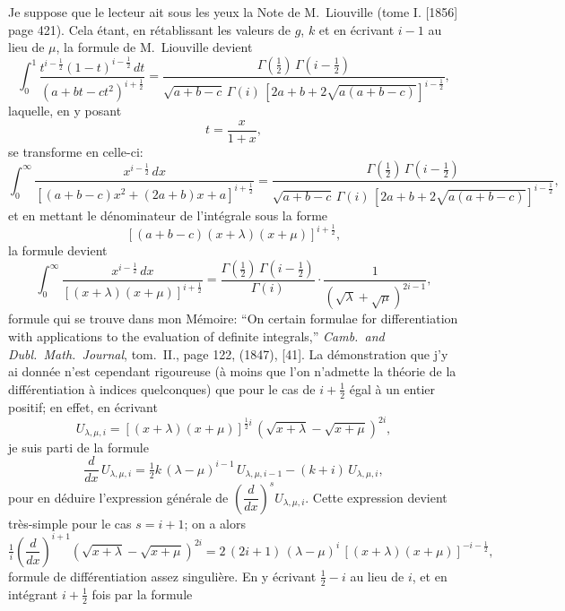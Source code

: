 \documentclass[11pt,a4paper]{book}
\theoremstyle{plain}
\begin{document}
Je suppose que le lecteur ait sous les yeux la Note de M.~Liouville (tome I. [1856] page 421). Cela \'{e}tant, en r\'{e}tablissant les valeurs de $g$, $k$ et en \'{e}crivant $i-1$ au lieu de $\mu$, la formule de M.~Liouville devient
\begin{equation}
\int_0^1\frac{t^{i-\frac{1}{2}}(1-t)^{i-\frac{1}{2}}\,dt}{(a+bt-ct^2)^{i+\frac{1}{2}}}
=\frac{\Gamma(\tfrac{1}{2})\,\Gamma(i-\tfrac{1}{2})}{\sqrt{a+b-c}\,\Gamma(i)\,[2a+b+2\sqrt{a(a+b-c)}]^{i-\frac{1}{2}}},
\end{equation}
laquelle, en y posant
\[
t=\frac{x}{1+x},
\]
se transforme en celle-ci:
\begin{equation}
\int_0^{\infty}\frac{x^{i-\frac{1}{2}}\,dx}{[(a+b-c)x^2+(2a+b)x+a]^{i+\frac{1}{2}}}
=\frac{\Gamma(\tfrac{1}{2})\,\Gamma(i-\tfrac{1}{2})}{\sqrt{a+b-c}\,\Gamma(i)\,[2a+b+2\sqrt{a(a+b-c)}]^{i-\frac{1}{2}}},
\end{equation}
et en mettant le d\'{e}nominateur de l'int\'{e}grale sous la forme
\[
[(a+b-c)(x+\lambda)(x+\mu)]^{i+\frac{1}{2}},
\]
la formule devient
\begin{equation}
\int_0^{\infty}\frac{x^{i-\frac{1}{2}}\,dx}{[(x+\lambda)(x+\mu)]^{i+\frac{1}{2}}}
=\frac{\Gamma(\tfrac{1}{2})\,\Gamma(i-\tfrac{1}{2})}{\Gamma(i)}\cdot\frac{1}{(\sqrt{\lambda}+\sqrt{\mu})^{2i-1}},
\end{equation}
formule qui se trouve dans mon M\'{e}moire: ``On certain formulae for differentiation with applications to the evaluation of definite integrals,'' \textit{Camb.\ and Dubl.\ Math.\ Journal}, tom.~II., page 122, (1847), [41]. La d\'{e}monstration que j'y ai donn\'{e}e n'est cependant rigoureuse (\`{a} moins que l'on n'admette la th\'{e}orie de la diff\'{e}rentiation \`{a} indices quelconques) que pour le cas de $i+\tfrac{1}{2}$ \'{e}gal \`{a} un entier positif; en effet, en \'{e}crivant
\[
U_{\lambda,\mu,i}=[(x+\lambda)(x+\mu)]^{\frac{1}{2}i}\,(\sqrt{x+\lambda}-\sqrt{x+\mu})^{2i},
\]
je suis parti de la formule
\[
\frac{d}{dx}\,U_{\lambda,\mu,i}=\tfrac{1}{2}k\,(\lambda-\mu)^{i-1}\,U_{\lambda,\mu,i-1}-(k+i)\,U_{\lambda,\mu,i},
\]
pour en d\'{e}duire l'expression g\'{e}n\'{e}rale de $\left(\dfrac{d}{dx}\right)^s U_{\lambda,\mu,i}$. Cette expression devient tr\`{e}s-simple pour le cas $s=i+1$; on a alors
\begin{equation}
\tfrac{1}{i}\left(\frac{d}{dx}\right)^{i+1}(\sqrt{x+\lambda}-\sqrt{x+\mu})^{2i}=2\,(2i+1)\,(\lambda-\mu)^i\,[(x+\lambda)(x+\mu)]^{-i-\frac{1}{2}},
\end{equation}
formule de diff\'{e}rentiation assez singuli\`{e}re. En y \'{e}crivant $\tfrac{1}{2}-i$ au lieu de $i$, et en int\'{e}grant $i+\tfrac{1}{2}$ fois par la formule
\end{document}
